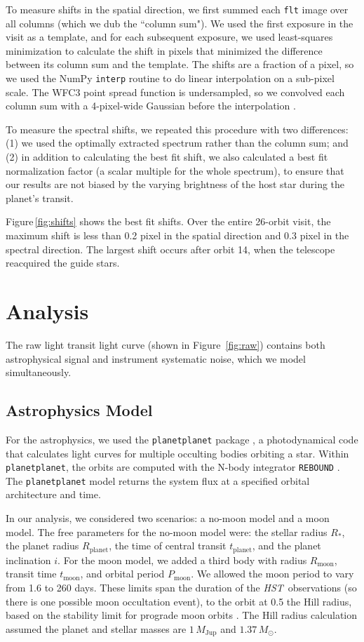 \documentclass[twocolumn]{aastex62}
\newcommand{\project}[1]{\textsl{#1}}
\newcommand{\HST}{\project{HST}}
\begin{document}
To measure shifts in the spatial direction, we first summed each \texttt{flt} image over all columns (which we dub the ``column sum"). We used the first exposure in the visit as a template, and for each subsequent exposure, we used least-squares minimization to calculate the shift in pixels that minimized the difference between its column sum and the template. The shifts are a fraction of a pixel, so we used the NumPy \texttt{interp} routine to do linear interpolation on a sub-pixel scale. The WFC3 point spread function is undersampled, so we convolved each column sum with a 4-pixel-wide Gaussian  before the interpolation \citep[following][]{deming13}.  

To measure the spectral shifts, we repeated this procedure with two differences: (1) we used the optimally extracted spectrum rather than the column sum; and (2) in addition to calculating the best fit shift, we also calculated a best fit normalization factor (a scalar multiple for the whole spectrum), to ensure that our results are not biased by the varying brightness of the host star during the planet's transit. 

Figure\,\ref{fig:shifts} shows the best fit shifts. Over the entire 26-orbit visit, the maximum shift is less than 0.2 pixel in the spatial direction and 0.3 pixel in the spectral direction. The largest shift occurs after orbit 14, when the telescope reacquired the guide stars. 


\section{Analysis}
The raw light transit light curve (shown in Figure~\ref{fig:raw}) contains both astrophysical signal and instrument systematic noise, which we model simultaneously. 

\subsection{Astrophysics Model}
For the astrophysics, we used the \texttt{planetplanet} package \citep{luger17}, a photodynamical code that calculates light curves for multiple occulting bodies orbiting a star. Within \texttt{planetplanet}, the orbits are computed with the N-body integrator \texttt{REBOUND} \citep{rein12}. The \texttt{planetplanet} model returns the system flux at a specified orbital architecture and time. 

In our analysis, we considered two scenarios: a no-moon model and a moon model. The free parameters for the no-moon model were: the stellar radius $R_*$, the planet radius $R_\mathrm{planet}$, the time of central transit $t_\mathrm{planet}$, and the planet inclination $i$. For the moon model, we added a third body with radius $R_\mathrm{moon}$, transit time $t_\mathrm{moon}$, and orbital period $P_\mathrm{moon}$. We allowed the moon period to vary from 1.6 to 260 days. These limits span the duration of the \HST\ observations (so there is one possible moon occultation event), to the orbit at 0.5 the Hill radius, based on the stability limit for prograde moon orbits \citep{domingos06}. The Hill radius calculation assumed the planet and stellar masses are $1\,M_\mathrm{Jup}$ and $1.37\,M_\odot$.
\end{document}
